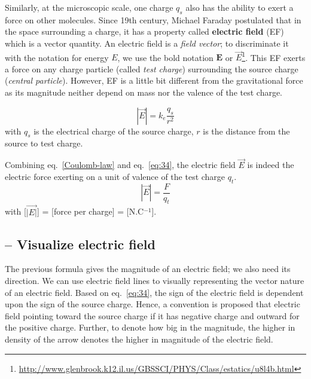 Similarly, at the microscopic scale, one charge $q_s$ also has the
ability to exert a force on other molecules. Since 19th century,
Michael Faraday postulated that in the space surrounding a charge, it
has a property called {\bf electric field} (EF) which is a vector
quantity. An electric field is a {\it field vector}; to discriminate
it with the notation for energy $E$, we use the bold notation
$\mathbf{E}$ or
$\vec{E}$\footnote{\url{http://www.glenbrook.k12.il.us/GBSSCI/PHYS/Class/estatics/u8l4b.html}}.
This EF exerts a force on any charge particle (called
{\it test charge}) surrounding the source charge
({\it central particle}). However, EF is a little bit different from
the gravitational force as its magnitude neither depend on mass nor the
valence of the test charge.

\begin{equation}
  \label{eq:34}
  |\vec{E}| = k_e \frac{q_s}{r^2}
\end{equation}
with $q_s$ is the electrical charge of the source charge, $r$ is the
distance from the source to test charge.

Combining eq.~\eqref{Coulomb-law} and eq.~\eqref{eq:34}, the electric
field $\vec{E}$ is indeed the electric force exerting on a unit of
valence of the test charge $q_t$.
\begin{equation}
  \label{eq:35}
  |\vec{E}| = \frac{F}{q_t}
\end{equation}
with [$\vec{|E|}$] = [force per charge] = [N.C$^{-1}$].

\subsection{-- Visualize electric field}
\label{sec:visu-electr-field}

The previous formula gives the magnitude of an electric field; we also
need its direction.  We can use electric field lines to visually
representing the vector nature of an electric field. Based on
eq.~\eqref{eq:34}, the sign of the electric field is dependent upon
the sign of the source charge. Hence, a convention is proposed that
electric field pointing toward the source charge if it has negative
charge and outward for the positive charge. Further, to denote how big
in the magnitude, the higher in density of the arrow denotes the
higher in magnitude of the electric field.

